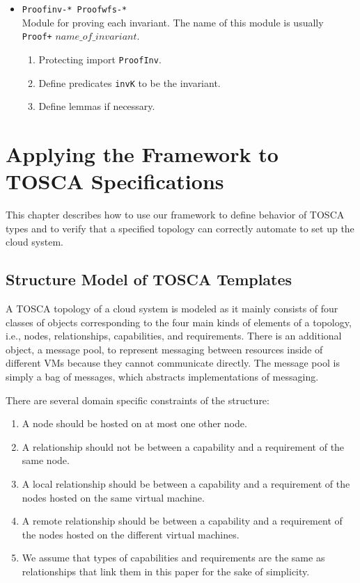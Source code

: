 \documentclass[12pt]{report}
\begin{document}
\begin{itemize}
\begin{enumerate}
  \end{enumerate}
\item {\tt Proofinv-*  Proofwfs-*}\\
  Module for proving each invariant. The name of this module is usually
  {\tt Proof+} $name\_of\_invariant$.
  \begin{enumerate}
  \item Protecting import {\tt ProofInv}.
  \item Define predicates {\tt invK} to be the invariant.
  \item Define lemmas if necessary.
  \end{enumerate}
\end{itemize}

\chapter{Applying the Framework to TOSCA Specifications}
\label{chap:appTOSCA}
This chapter describes how to use our framework to define behavior of
TOSCA types and to verify that a specified topology can correctly
automate to set up the cloud system.

\section{Structure Model of TOSCA Templates}
\label{sec:TOSCAstructure}
A TOSCA topology of a cloud system is modeled as it mainly consists of
four classes of objects corresponding to the four main kinds of
elements of a topology, i.e., nodes, relationships, capabilities, and
requirements. There is an additional object, a message pool, to
represent messaging between resources inside of different VMs because
they cannot communicate directly. The message pool is simply a bag of
messages, which abstracts implementations of messaging.

There are several domain specific constraints of the structure:
\begin{enumerate}
\item A node should be hosted on at most one other node.
\item A relationship should not be between a capability and a
  requirement of the same node.
\item A local relationship should be between a capability and a
  requirement of the nodes hosted on the same virtual machine.
\item A remote relationship should be between a capability and a
  requirement of the nodes hosted on the different virtual machines.
\item We assume that types of capabilities and requirements are
  the same as relationships that link them in this paper for the sake
  of simplicity.
\end{enumerate}
\end{document}
